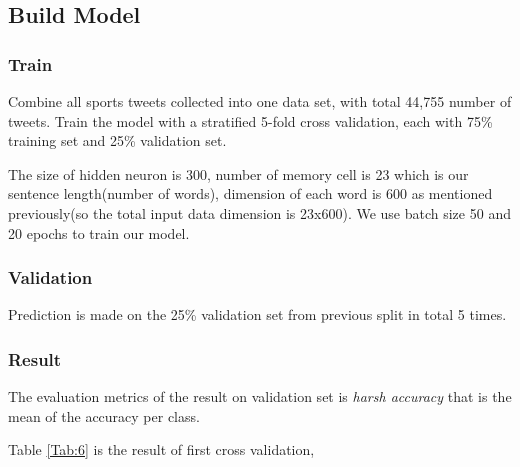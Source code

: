 \documentclass[journal, a4paper]{IEEEtran}
\begin{document}
\subsection{Build Model}
\subsubsection{Train}
Combine all sports tweets collected into one data set, with total 44,755 number of tweets. Train the model with a stratified 5-fold cross validation, each with 75\% training set and 25\% validation set. 

The size of hidden neuron is 300, number of memory cell is 23 which is our sentence length(number of words), dimension of each word is 600 as mentioned previously(so the total input data dimension is 23x600). We use batch size 50 and 20 epochs to train our model.\\ 
\subsubsection{Validation}
Prediction is made on the 25\% validation set from previous split in total 5 times.\\
\subsubsection{Result}
The evaluation metrics of the result on validation set is \textit{harsh accuracy} that is the mean of the accuracy per class. 

Table \ref{Tab:6} is the result of first cross validation,
\begin{table}[ht]
	\caption{LSTM prediction result of 1st cross validation: confusion matrix and accuracy per class }\label{Tab:6}
\end{table}
\end{document}

